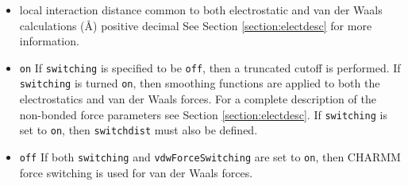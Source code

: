 \begin{itemize}


\item
{}
{local interaction distance common to both electrostatic 
and van der Waals calculations (\AA)}
{positive decimal}
{%
See Section \ref{section:electdesc} for more information.}

\item
{}
{{\tt on}}
{If {\tt switching} is
specified to be {\tt off}, then a truncated cutoff is performed.
If {\tt switching} is turned {\tt on}, then smoothing functions
are applied to both the electrostatics and van der Waals forces.
For a complete description of the non-bonded force parameters see
Section \ref{section:electdesc}.  If {\tt switching} is set to
{\tt on}, then {\tt switchdist} must also be defined.}

\item
{}
{{\tt off}}
{If both {\tt switching} and {\tt vdwForceSwitching} are set to {\tt on},
then CHARMM force switching is used for van der Waals forces.
}



\end{itemize}
